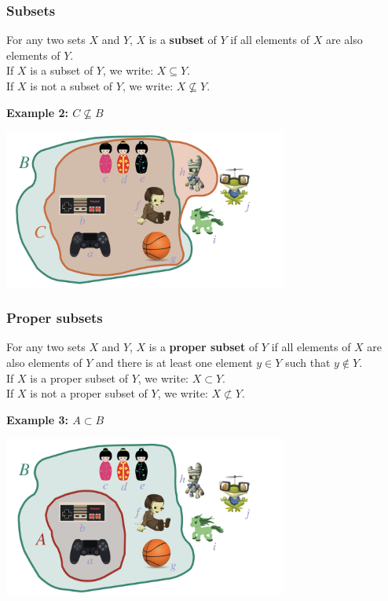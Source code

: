\documentclass[fleqn,10pt,serif,xcolor=svgnames,xcolor=table,aspectratio=169]{beamer}
\begin{document}
\begin{frame}
  \frametitle{Subsets}

  For any two sets $X$ and $Y$, $X$ is a \textbf{subset} of $Y$ if all elements of $X$ are also elements of $Y$. \\
  If $X$ is a subset of $Y$, we write: $X \subseteq Y$.\\
  If $X$ is not a subset of $Y$, we write: $X \not \subseteq Y$.

  \bigskip

  \hfill \textbf{Example 2: $C \not \subseteq B$}

  \hfill \includegraphics[width = 0.7\textwidth]{01b-sets-relations-operations/01b-sets-relations-operations-002.jpeg}

\end{frame}

\begin{frame}
  \frametitle{Proper subsets}

  For any two sets $X$ and $Y$, $X$ is a \textbf{proper subset} of $Y$ if all elements of $X$ are also elements of $Y$ and there is at least one element $y \in Y$ such that $y \not \in Y$.\\
  If $X$ is a proper subset of $Y$, we write: $X \subset Y$.\\
  If $X$ is not a proper subset of $Y$, we write: $X \not \subset Y$.

\pause

  \bigskip

  \hfill \textbf{Example 3: $A \subset B$}

  \hfill \includegraphics[width = 0.7\textwidth]{01b-sets-relations-operations/01b-sets-relations-operations-001.jpeg}

\end{frame}
\end{document}
